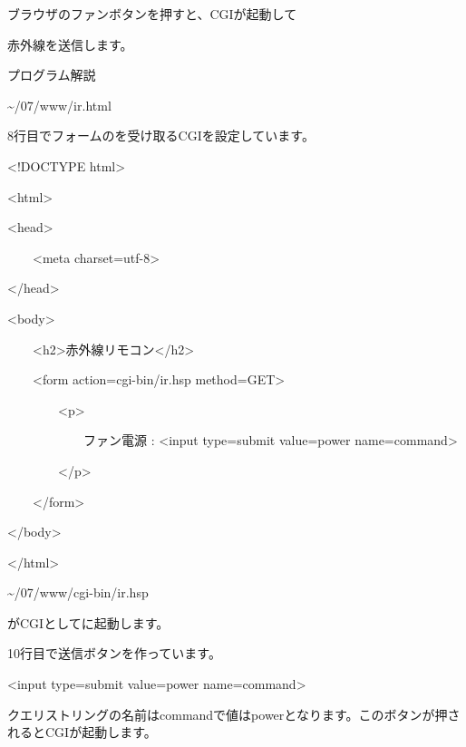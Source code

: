 \documentclass[a4paper,12pt,dvipdfmx]{jarticle}
\begin{document}
ブラウザのファンボタンを押すと、CGIが起動して

赤外線を送信します。


\bigskip

\clearpage
プログラム解説

{\textasciitilde}/07/www/ir.html

8行目でフォームのを受け取るCGIを設定しています。

\centering
\begin{boxedminipage}{0.95\textwidth}
	{\textless}!DOCTYPE html{\textgreater}

		{\textless}html{\textgreater}

	{\textless}head{\textgreater}

	\ \ \ \ {\textless}meta charset={\textquotedbl}utf-8{\textquotedbl}{\textgreater}

	{\textless}/head{\textgreater}

	{\textless}body{\textgreater}

	\ \ \ \ {\textless}h2{\textgreater}赤外線リモコン{\textless}/h2{\textgreater}

	\ \ \ \ {\textless}form action={\textquotedbl}cgi-bin/ir.hsp{\textquotedbl}
	method={\textquotedbl}GET{\textquotedbl}{\textgreater}

	\ \ \ \ \ \ \ \ {\textless}p{\textgreater}

	\ \ \ \ \ \ \ \ \ \ \ \ ファン電源 : {\textless}input type={\textquotedbl}submit{\textquotedbl}
	value={\textquotedbl}power{\textquotedbl} name={\textquotedbl}command{\textquotedbl}{\textgreater}

	\ \ \ \ \ \ \ \ {\textless}/p{\textgreater}

	\ \ \ \ {\textless}/form{\textgreater}

	{\textless}/body{\textgreater}

	{\textless}/html{\textgreater}
\end{boxedminipage}
\flushleft
{\textasciitilde}/07/www/cgi-bin/ir.hsp

がCGIとしてに起動します。

10行目で送信ボタンを作っています。

{\textless}input type={\textquotedbl}submit{\textquotedbl} value={\textquotedbl}power{\textquotedbl}
name={\textquotedbl}command{\textquotedbl}{\textgreater}

クエリストリングの名前はcommandで値はpowerとなります。このボタンが押されるとCGIが起動します。


\bigskip
\end{document}

